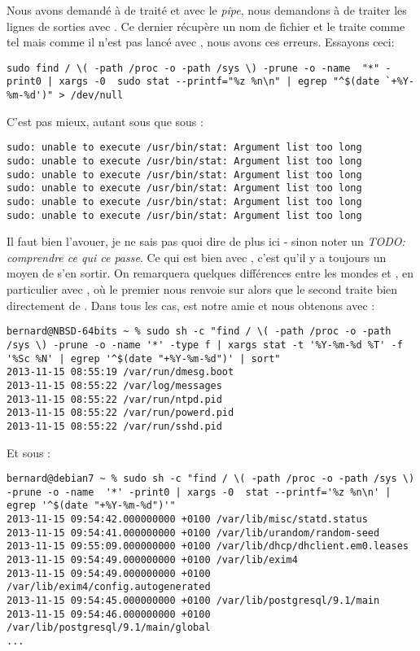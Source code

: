 Nous avons demandé à  de traité  et avec le \emph{pipe}, nous demandons à  de traiter les lignes de sorties avec . Ce dernier récupère un nom de fichier et le traite comme tel mais comme il n'est pas lancé avec , nous avons ces erreurs. Essayons ceci:

\begin{lstlisting}
sudo find / \( -path /proc -o -path /sys \) -prune -o -name  "*" -print0 | xargs -0  sudo stat --printf="%z %n\n" | egrep "^$(date `+%Y-%m-%d')" > /dev/null
\end{lstlisting}

C'est pas mieux, autant sous \linux{} que sous \netbsd{}:

\begin{lstlisting}
sudo: unable to execute /usr/bin/stat: Argument list too long
sudo: unable to execute /usr/bin/stat: Argument list too long
sudo: unable to execute /usr/bin/stat: Argument list too long
sudo: unable to execute /usr/bin/stat: Argument list too long
sudo: unable to execute /usr/bin/stat: Argument list too long
sudo: unable to execute /usr/bin/stat: Argument list too long
\end{lstlisting}

Il faut bien l'avouer, je ne sais pas quoi dire de plus ici - sinon noter un \emph{TODO: comprendre ce qui ce passe}. Ce qui est bien avec \unix{}, c'est qu'il y a toujours un moyen de s'en sortir. On remarquera quelques différences entre les mondes \linux{} et \BSD{}, en particulier avec , où le premier nous renvoie sur \bash{} alors que le second traite bien directement de \sh{}. Dans tous les cas,  est notre amie et nous obtenons avec  \netbsd{}:

\begin{lstlisting}
bernard@NBSD-64bits ~ % sudo sh -c "find / \( -path /proc -o -path /sys \) -prune -o -name '*' -type f | xargs stat -t '%Y-%m-%d %T' -f '%Sc %N' | egrep '^$(date "+%Y-%m-%d")' | sort"
2013-11-15 08:55:19 /var/run/dmesg.boot
2013-11-15 08:55:22 /var/log/messages
2013-11-15 08:55:22 /var/run/ntpd.pid
2013-11-15 08:55:22 /var/run/powerd.pid
2013-11-15 08:55:22 /var/run/sshd.pid
\end{lstlisting}

Et sous \linux{}:

\begin{lstlisting}
bernard@debian7 ~ % sudo sh -c "find / \( -path /proc -o -path /sys \) -prune -o -name  '*' -print0 | xargs -0  stat --printf='%z %n\n' | egrep '^$(date "+%Y-%m-%d")'"
2013-11-15 09:54:42.000000000 +0100 /var/lib/misc/statd.status
2013-11-15 09:54:41.000000000 +0100 /var/lib/urandom/random-seed
2013-11-15 09:55:09.000000000 +0100 /var/lib/dhcp/dhclient.em0.leases
2013-11-15 09:54:49.000000000 +0100 /var/lib/exim4
2013-11-15 09:54:49.000000000 +0100 /var/lib/exim4/config.autogenerated
2013-11-15 09:54:45.000000000 +0100 /var/lib/postgresql/9.1/main
2013-11-15 09:54:46.000000000 +0100 /var/lib/postgresql/9.1/main/global
...
\end{lstlisting}

